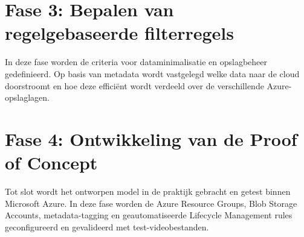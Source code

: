 \section{Fase 3: Bepalen van regelgebaseerde filterregels}
In deze fase worden de criteria voor dataminimalisatie en opslagbeheer gedefinieerd. Op basis van metadata wordt vastgelegd welke data naar de cloud doorstroomt en hoe deze efficiënt wordt verdeeld over de verschillende Azure-opslaglagen.

\section{Fase 4: Ontwikkeling van de Proof of Concept}
Tot slot wordt het ontworpen model in de praktijk gebracht en getest binnen Microsoft Azure. In deze fase worden de Azure Resource Groups, Blob Storage Accounts, metadata-tagging en geautomatiseerde Lifecycle Management rules geconfigureerd en gevalideerd met test-videobestanden.